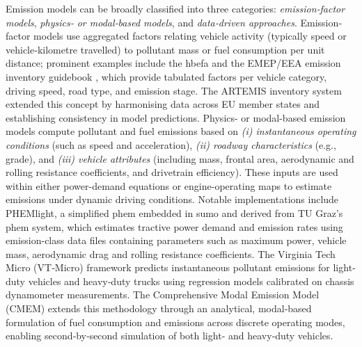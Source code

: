 Emission models can be broadly classified into three categories: \emph{emission‐factor models}, \emph{physics‐ or modal‐based models}, and \emph{data‐driven approaches}. Emission‐factor models use aggregated factors relating vehicle activity (typically speed or vehicle‐kilometre travelled) to pollutant mass or fuel consumption per unit distance; prominent examples include the \ac{hbefa} \cite{HBEFA2023} and the EMEP/EEA emission inventory guidebook \cite{EMEP_EEA2023}, which provide tabulated factors per vehicle category, driving speed, road type, and emission stage. The ARTEMIS inventory system extended this concept by harmonising data across EU member states and establishing consistency in model predictions. \cite{BoulterMcCrae2007}
\mynewline
Physics- or modal-based emission models compute pollutant and fuel emissions based on \emph{(i) instantaneous operating conditions} (such as speed and acceleration), \emph{(ii) roadway characteristics} (e.g., grade), and \emph{(iii) vehicle attributes} (including mass, frontal area, aerodynamic and rolling resistance coefficients, and drivetrain efficiency). These inputs are used within either power-demand equations or engine-operating maps to estimate emissions under dynamic driving conditions. Notable implementations include PHEMlight, a simplified \ac{phem} embedded in \ac{sumo} and derived from TU Graz’s \ac{phem} system, which estimates tractive power demand and emission rates using emission-class data files containing parameters such as maximum power, vehicle mass, aerodynamic drag and rolling resistance coefficients. \cite{SUMOPHEMlight} The Virginia Tech Micro (VT‐Micro) framework predicts instantaneous pollutant emissions for light‐duty vehicles and heavy‐duty trucks using regression models calibrated on chassis dynamometer measurements. \cite{Rakha2004}  
The Comprehensive Modal Emission Model (CMEM) extends this methodology through an analytical, modal‐based formulation of fuel consumption and emissions across discrete operating modes, enabling second‐by‐second simulation of both light‐ and heavy‐duty vehicles. \cite{CMEM_UCR}
\mynewline
